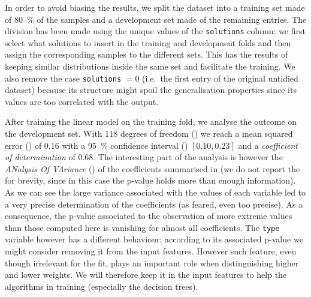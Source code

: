 In order to avoid biasing the results, we split the dataset into a training set made of \SI{80}{\percent} of the samples and a development set made of the remaining entries.
The division has been made using the unique values of the \texttt{solutions} column: we first select what solutions to insert in the training and development folds and then assign the corresponding samples to the different sets.
This has the results of keeping similar distributions inside the same set and facilitate the training.\footnotemark{}
We also remove the case \texttt{solutions} $= 0$ (i.e.\ the first entry of the original untidied dataset) because its structure might spoil the generalisation properties since its values are too correlated with the output.

After training the linear model on the training fold, we analyse the outcome on the development set.
With 118 degrees of freedom (\dof) we reach a mean squared error (\mse) of \num{0.16} with a \SI{95}{\percent} confidence interval (\ci) $[0.10, 0.23]$ and a \emph{coefficient of determination} \rr of \num{0.68}.
The interesting part of the analysis is however the \emph{ANalysis Of VAriance} (\anova) of the coefficients summarised in  (we do not report the \ci for brevity, since in this case the p-value holds more than enough information).
As we can see the large variance associated with the values of each variable led to a very precise determination of the coefficients (as feared, even too precise).
As a consequence, the p-value associated to the observation of more extreme values than those computed here is vanishing for almost all coefficients.
The \texttt{type} variable however has a different behaviour: according to its associated p-value we might consider removing it from the input features.
However such feature, even though irrelevant for the fit, plays an important role when distinguishing higher and lower weights.
We will therefore keep it in the input features to help the algorithms in training (especially the decision trees).\footnotemark{}

